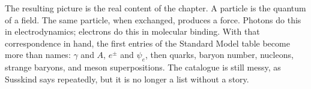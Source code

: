 The resulting picture is the real content of the chapter. A particle is the quantum of a field. The same particle, when exchanged, produces a force. Photons do this in electrodynamics; electrons do this in molecular binding. With that correspondence in hand, the first entries of the Standard Model table become more than names: \(\gamma\) and \(A\), \(e^\pm\) and \(\psi_e\), then quarks, baryon number, nucleons, strange baryons, and meson superpositions. The catalogue is still messy, as Susskind says repeatedly, but it is no longer a list without a story.